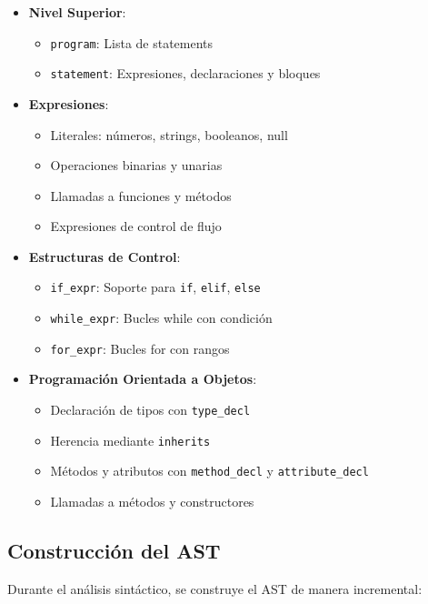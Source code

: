 \documentclass[11pt, a4paper, twoside]{article} %
\begin{document}
\begin{itemize}
    \item \textbf{Nivel Superior}:
    \begin{itemize}
        \item \texttt{program}: Lista de statements
        \item \texttt{statement}: Expresiones, declaraciones y bloques
    \end{itemize}

    \item \textbf{Expresiones}:
    \begin{itemize}
        \item Literales: números, strings, booleanos, null
        \item Operaciones binarias y unarias
        \item Llamadas a funciones y métodos
        \item Expresiones de control de flujo
    \end{itemize}

    \item \textbf{Estructuras de Control}:
    \begin{itemize}
        \item \texttt{if\_expr}: Soporte para \texttt{if}, \texttt{elif}, \texttt{else}
        \item \texttt{while\_expr}: Bucles while con condición
        \item \texttt{for\_expr}: Bucles for con rangos
    \end{itemize}

    \item \textbf{Programación Orientada a Objetos}:
    \begin{itemize}
        \item Declaración de tipos con \texttt{type\_decl}
        \item Herencia mediante \texttt{inherits}
        \item Métodos y atributos con \texttt{method\_decl} y \texttt{attribute\_decl}
        \item Llamadas a métodos y constructores
    \end{itemize}
\end{itemize}

\subsection{Construcción del AST}

Durante el análisis sintáctico, se construye el AST de manera incremental:
\end{document}
